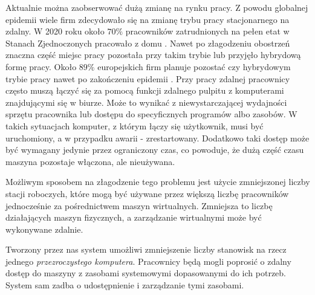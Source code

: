 \documentclass[../wstep.tex]{subfiles}
\begin{document}
Aktualnie można zaobserwować dużą zmianę na rynku pracy.
Z powodu globalnej epidemii wiele firm zdecydowało się na zmianę trybu pracy stacjonarnego na zdalny. W 2020 roku około $70\%$ pracowników zatrudnionych na pełen etat w Stanach Zjednoczonych pracowało z domu \parencite{remote-2020}.
Nawet po złagodzeniu obostrzeń znaczna część miejsc pracy pozostała przy takim trybie lub przyjęło hybrydową formę pracy. Około $89\%$ europejskich firm planuje pozostać czy hybrydowym trybie pracy nawet po zakończeniu epidemii \parencite{remote-2021}.
Przy pracy zdalnej pracownicy często muszą łączyć się za pomocą funkcji zdalnego pulpitu z komputerami znajdującymi się w biurze.
Może to wynikać z niewystarczającej wydajności sprzętu pracownika lub dostępu do specyficznych programów albo zasobów.
W takich sytuacjach komputer, z którym łączy się użytkownik, musi być uruchomiony, a w przypadku awarii - zrestartowany.
Dodatkowo taki dostęp może być wymagany jedynie przez ograniczony czas, co powoduje, że dużą część czasu maszyna pozostaje włączona, ale nieużywana.

Możliwym sposobem na złagodzenie tego problemu jest użycie zmniejszonej liczby stacji roboczych, które mogą być używane przez większą liczbę pracowników jednocześnie za pośrednictwem maszyn wirtualnych.
Zmniejsza to liczbę działających maszyn fizycznych, a zarządzanie wirtualnymi może być wykonywane zdalnie.

Tworzony przez nas system umożliwi zmniejszenie liczby stanowisk na rzecz jednego \textit{przezroczystego komputera}.
Pracownicy będą mogli poprosić o zdalny dostęp do maszyny z zasobami systemowymi dopasowanymi do ich potrzeb.
System sam zadba o udostępnienie i zarządzanie tymi zasobami.
\end{document}

